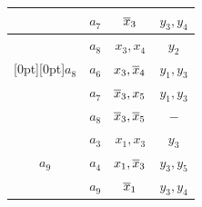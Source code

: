 \begin{table}
\begin{center}
\begin{minipage}[t]{190pt}
\begin{tabular}{|c|c|c|c|}


 & $a_7$ & $\overline x_3$ & $y_3,y_4$ \\


\hline




  & $a_8$ & $x_3,x_4$ & $y_2$ \\




\multicolumn{1}{|c|}{\raisebox{-6pt}[0pt][0pt]{$a_8$}} & $a_6$ & $x_3,\overline x_4$ & $y_1,y_3$ \\




 & $a_7$ & $\overline x_3,x_5$ & $y_1,y_3$ \\




 & $a_8$ & $\overline x_3,\overline x_5$ & $-$ \\




\hline


  & $a_3$ & $x_1,x_3$ & $y_3$ \\




 $a_9$& $a_4$ & $x_1,\overline x_3$ & $y_3,y_5$ \\




 & $a_9$ & $\overline x_1$ & $y_3,y_4$ \\


\hline


\end{tabular}




\end{minipage}


\end{center}


\end{table}











